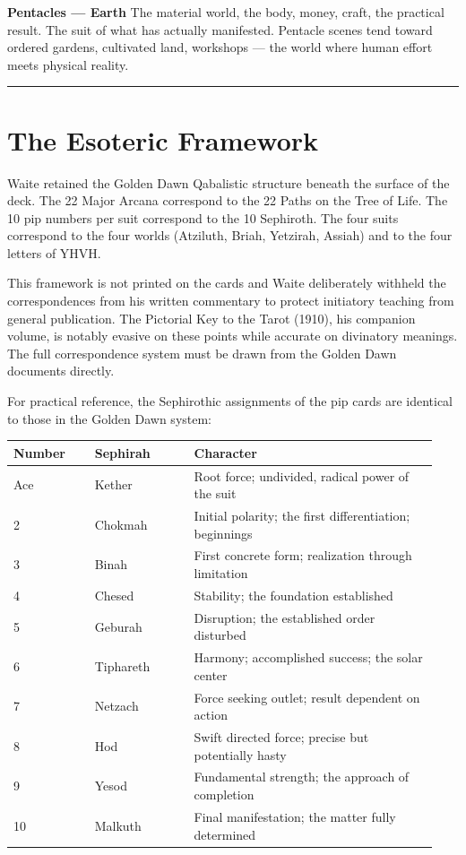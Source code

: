 \textbf{Pentacles --- Earth} The material world, the body, money, craft, the practical result. The suit of what has actually manifested. Pentacle scenes tend toward ordered gardens, cultivated land, workshops --- the world where human effort meets physical reality.

\begin{center}\rule{0.5\linewidth}{0.5pt}\end{center}

\section{The Esoteric Framework}\label{the-esoteric-framework}

Waite retained the Golden Dawn Qabalistic structure beneath the surface of the deck. The 22 Major Arcana correspond to the 22 Paths on the Tree of Life. The 10 pip numbers per suit correspond to the 10 Sephiroth. The four suits correspond to the four worlds (Atziluth, Briah, Yetzirah, Assiah) and to the four letters of YHVH.

This framework is not printed on the cards and Waite deliberately withheld the correspondences from his written commentary to protect initiatory teaching from general publication. The Pictorial Key to the Tarot (1910), his companion volume, is notably evasive on these points while accurate on divinatory meanings. The full correspondence system must be drawn from the Golden Dawn documents directly.

For practical reference, the Sephirothic assignments of the pip cards are identical to those in the Golden Dawn system:

\begin{longtable}[]{@{}>{\RaggedRight\small}p{0.18\linewidth}>{\RaggedRight\small}p{0.22\linewidth}>{\RaggedRight\small}p{0.54\linewidth}@{}}
\toprule\noalign{}
Number & Sephirah & Character \\
\midrule\noalign{}
\endhead
\bottomrule\noalign{}
\endlastfoot
Ace & Kether & Root force; undivided, radical power of the suit \\
2 & Chokmah & Initial polarity; the first differentiation; beginnings \\
3 & Binah & First concrete form; realization through limitation \\
4 & Chesed & Stability; the foundation established \\
5 & Geburah & Disruption; the established order disturbed \\
6 & Tiphareth & Harmony; accomplished success; the solar center \\
7 & Netzach & Force seeking outlet; result dependent on action \\
8 & Hod & Swift directed force; precise but potentially hasty \\
9 & Yesod & Fundamental strength; the approach of completion \\
10 & Malkuth & Final manifestation; the matter fully determined \\
\end{longtable}

